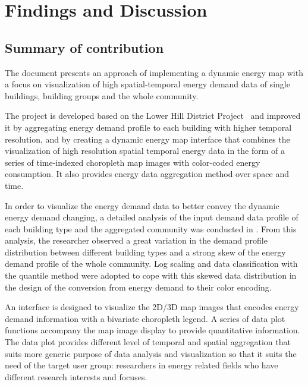 
\chapter{Findings and Discussion} %

\label{Chapter7} %


\section{Summary of contribution}
The document presents an approach of implementing a dynamic energy map
with a focus on visualization of high spatial-temporal energy demand
data of single buildings, building groups and the whole
community. 

The project is developed based on the Lower Hill District
Project~\cite{baird2014} and improved it by aggregating energy demand
profile to each building with higher temporal resolution, and by
creating a dynamic energy map interface that combines the
visualization of high resolution spatial temporal energy data in the
form of a series of time-indexed choropleth map images with
color-coded energy consumption. It also provides energy data
aggregation method over space and time.

In order to visualize the energy demand data to better convey the
dynamic energy demand changing, a detailed analysis of the input
demand data profile of each building type and the aggregated community
was conducted in . From this analysis, the researcher
observed a great variation in the demand profile distribution between
different building types and a strong skew of the energy demand
profile of the whole community. Log scaling and data classification
with the quantile method were adopted to cope with this skewed data
distribution in the design of the conversion from energy demand to
their color encoding.

An interface is designed to visualize the 2D/3D map images that
encodes energy demand information with a bivariate choropleth
legend. A series of data plot functions accompany the map image
display to provide quantitative information. The data plot provides
different level of temporal and spatial aggregation that suits
more generic purpose of data analysis and visualization so that it
suits the need of the target user group: researchers in energy related
fields who have different research interests and focuses.

